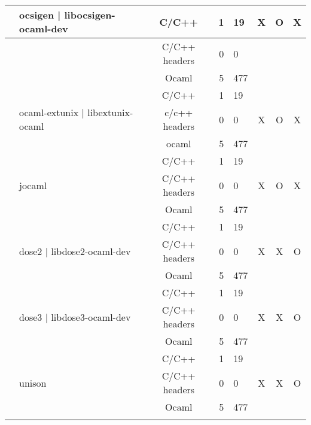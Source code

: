 \documentclass[11pt,a4paper]{article}
\begin{document}
\begin{table}[h,t]
\begin{tabular}{|>{\centering}m{3cm}| m{3cm}|c|r|m{1cm}| c| c|c|}
& \multirow{3}{3cm}{ocsigen | libocsigen-ocaml-dev} & C/C++ & 1 & 19 & \multirow{3}{*}{X} & \multirow{3}{*}{O} & \multirow{3}{*}{X}\\
 \cline{3-5}
 &  &                           C/C++ headers & 0 & 0 & & & \\
 \cline{3-5}
 & &                           Ocaml & 5 & 477 & & & \\
 \cline{2-8}


 &\multirow{3}{3cm}{ocaml-extunix | libextunix-ocaml} & C/C++ & 1 & 19 & \multirow{3}{*}{X} & \multirow{3}{*}{O} & \multirow{3}{*}{X}\\
 \cline{3-5}
 &  &                           c/c++ headers & 0 & 0 & & & \\
 \cline{3-5}
 & &                           ocaml & 5 & 477 & & & \\
 \cline{2-8}



 & \multirow{3}{*}{jocaml} & C/C++ & 1 & 19 & \multirow{3}{*}{X} & \multirow{3}{*}{O} & \multirow{3}{*}{X}\\
 \cline{3-5}
 &  &                           C/C++ headers & 0 & 0 & & & \\
 \cline{3-5}
 & &                           Ocaml & 5 & 477 & & & \\
 \cline{2-8}



 & \multirow{3}{3cm}{dose2 | libdose2-ocaml-dev} & C/C++ & 1 & 19 & \multirow{3}{*}{X} & \multirow{3}{*}{X} & \multirow{3}{*}{O}\\
 \cline{3-5}
 &  &                           C/C++ headers & 0 & 0 & & & \\
 \cline{3-5}
 & &                           Ocaml & 5 & 477 & & & \\
 \cline{2-8}


 & \multirow{3}{3cm}{dose3 | libdose3-ocaml-dev} & C/C++ & 1 & 19 & \multirow{3}{*}{X} & \multirow{3}{*}{X} & \multirow{3}{*}{O}\\
 \cline{3-5}
 &  &                           C/C++ headers & 0 & 0 & & & \\
 \cline{3-5}
 & &                           Ocaml & 5 & 477 & & & \\
 \cline{2-8}

 

 & \multirow{3}{*}{unison} & C/C++ & 1 & 19 & \multirow{3}{*}{X} & \multirow{3}{*}{X} & \multirow{3}{*}{O}\\
 \cline{3-5}
 &  &                           C/C++ headers & 0 & 0 & & & \\
 \cline{3-5}
 & &                           Ocaml & 5 & 477 & & & \\
 \cline{2-8}



\end{tabular}
\end{table}
\end{document}
